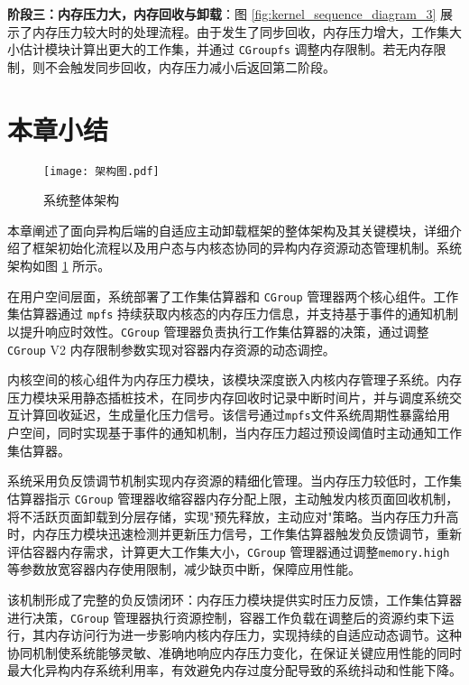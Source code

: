 \textbf{阶段三：内存压力大，内存回收与卸载}：图 \ref{fig:kernel_sequence_diagram_3} 展示了内存压力较大时的处理流程。由于发生了同步回收，内存压力增大，工作集大小估计模块计算出更大的工作集，并通过 \texttt{CGroupfs} 调整内存限制。若无内存限制，则不会触发同步回收，内存压力减小后返回第二阶段。

\section{本章小结}

\begin{figure}[h]
    \centering
    \texttt{[image: 架构图.pdf]}
    \caption{系统整体架构}
    \label{fig:system_architecture}
\end{figure}

本章阐述了面向异构后端的自适应主动卸载框架的整体架构及其关键模块，详细介绍了框架初始化流程以及用户态与内核态协同的异构内存资源动态管理机制。系统架构如图 \ref{fig:system_architecture} 所示。

在用户空间层面，系统部署了工作集估算器和 \texttt{CGroup} 管理器两个核心组件。工作集估算器通过 \texttt{mpfs} 持续获取内核态的内存压力信息，并支持基于事件的通知机制以提升响应时效性。\texttt{CGroup} 管理器负责执行工作集估算器的决策，通过调整 \texttt{CGroup} V2 内存限制参数实现对容器内存资源的动态调控。

内核空间的核心组件为内存压力模块，该模块深度嵌入内核内存管理子系统。内存压力模块采用静态插桩技术，在同步内存回收时记录中断时间片，并与调度系统交互计算回收延迟，生成量化压力信号。该信号通过\texttt{mpfs}文件系统周期性暴露给用户空间，同时实现基于事件的通知机制，当内存压力超过预设阈值时主动通知工作集估算器。

系统采用负反馈调节机制实现内存资源的精细化管理。当内存压力较低时，工作集估算器指示 \texttt{CGroup} 管理器收缩容器内存分配上限，主动触发内核页面回收机制，将不活跃页面卸载到分层存储，实现"预先释放，主动应对"策略。当内存压力升高时，内存压力模块迅速检测并更新压力信号，工作集估算器触发负反馈调节，重新评估容器内存需求，计算更大工作集大小，\texttt{CGroup} 管理器通过调整\texttt{memory.high}等参数放宽容器内存使用限制，减少缺页中断，保障应用性能。

该机制形成了完整的负反馈闭环：内存压力模块提供实时压力反馈，工作集估算器进行决策，\texttt{CGroup} 管理器执行资源控制，容器工作负载在调整后的资源约束下运行，其内存访问行为进一步影响内核内存压力，实现持续的自适应动态调节。这种协同机制使系统能够灵敏、准确地响应内存压力变化，在保证关键应用性能的同时最大化异构内存系统利用率，有效避免内存过度分配导致的系统抖动和性能下降。
